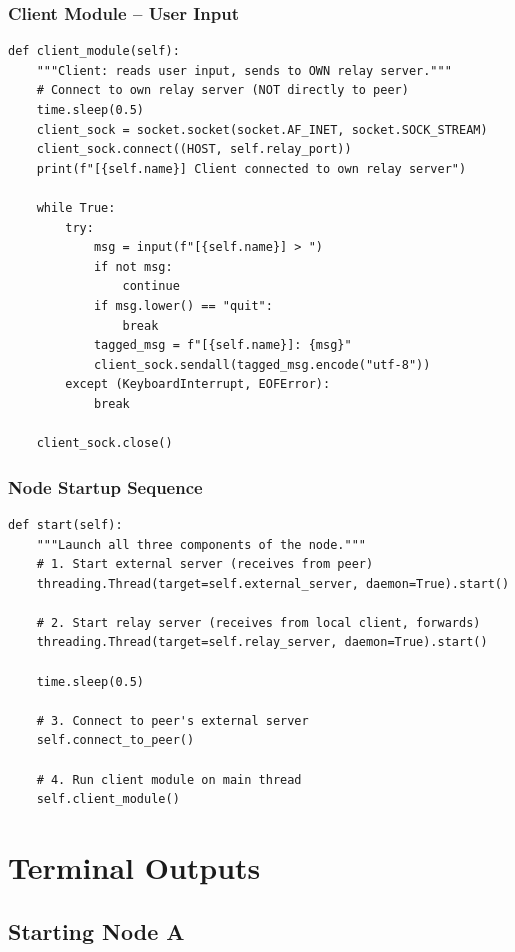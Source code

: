 \documentclass[11pt]{article}
\begin{document}
\newpage

\subsubsection{Client Module -- User Input}
\begin{lstlisting}
def client_module(self):
    """Client: reads user input, sends to OWN relay server."""
    # Connect to own relay server (NOT directly to peer)
    time.sleep(0.5)
    client_sock = socket.socket(socket.AF_INET, socket.SOCK_STREAM)
    client_sock.connect((HOST, self.relay_port))
    print(f"[{self.name}] Client connected to own relay server")
    
    while True:
        try:
            msg = input(f"[{self.name}] > ")
            if not msg:
                continue
            if msg.lower() == "quit":
                break
            tagged_msg = f"[{self.name}]: {msg}"
            client_sock.sendall(tagged_msg.encode("utf-8"))
        except (KeyboardInterrupt, EOFError):
            break
    
    client_sock.close()
\end{lstlisting}

\subsubsection{Node Startup Sequence}
\begin{lstlisting}
def start(self):
    """Launch all three components of the node."""
    # 1. Start external server (receives from peer)
    threading.Thread(target=self.external_server, daemon=True).start()
    
    # 2. Start relay server (receives from local client, forwards)
    threading.Thread(target=self.relay_server, daemon=True).start()
    
    time.sleep(0.5)
    
    # 3. Connect to peer's external server
    self.connect_to_peer()
    
    # 4. Run client module on main thread
    self.client_module()
\end{lstlisting}

\newpage

\section{Terminal Outputs}

\subsection{Starting Node A}
\end{document}

